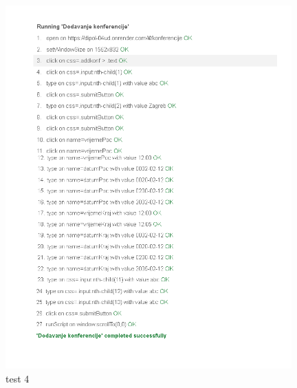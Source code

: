 \begin{itemize}
\begin{figure}[htb]
			 		\includegraphics[width=11cm]{slike/test_4.png}
			 		\caption{test 4}
			 		\label{fig:fer-logo}
			 	\end{figure}
			 \end{itemize}
			 
			 \newpage
			 \newpage
			 

